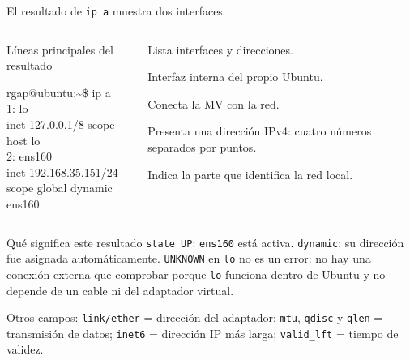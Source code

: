 \documentclass[aspectratio=169,10pt,c]{beamer}
\begin{document}
\begin{frame}{El resultado de \texttt{ip a} muestra dos interfaces}
\begin{columns}[T,onlytextwidth]
\begin{exampleblock}{Líneas principales del resultado}
\begin{terminal}
rgap@ubuntu:\textasciitilde\$ ip a\\
1: lo\\
\quad inet 127.0.0.1/8 scope host lo\\
2: ens160\\
\quad inet 192.168.35.151/24\\
\quad scope global dynamic ens160
\end{terminal}
\end{exampleblock}
\begin{description}\small
  \item[\texttt{ip a}] Lista interfaces y direcciones.
  \item[\texttt{lo}] Interfaz interna del propio Ubuntu.
  \item[\texttt{ens160}] Conecta la MV con la red.
  \item[\texttt{inet}] Presenta una dirección IPv4: cuatro números separados por puntos.
  \item[\texttt{/24}] Indica la parte que identifica la red local.
\end{description}
\end{columns}
\begin{alertblock}{Qué significa este resultado}
\small \texttt{state UP}: \texttt{ens160} está activa. \texttt{dynamic}: su dirección fue asignada automáticamente. \texttt{UNKNOWN} en \texttt{lo} no es un error: no hay una conexión externa que comprobar porque \texttt{lo} funciona dentro de Ubuntu y no depende de un cable ni del adaptador virtual.
\end{alertblock}
\scriptsize Otros campos: \texttt{link/ether} = dirección del adaptador; \texttt{mtu}, \texttt{qdisc} y \texttt{qlen} = transmisión de datos; \texttt{inet6} = dirección IP más larga; \texttt{valid\_lft} = tiempo de validez.
\end{frame}
\end{document}
